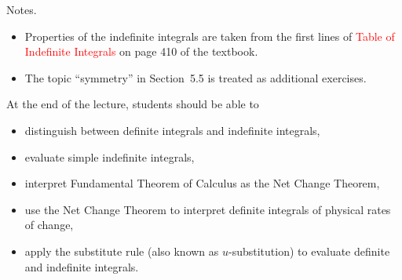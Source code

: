 \documentclass[../main]{subfiles}
\begin{document}
%
%
Notes.
  \begin{itemize}
    \item Properties of the indefinite integrals are taken from the first lines of \textcolor{red}{ Table of Indefinite Integrals} on page 410 of the textbook.
    \item The topic ``symmetry'' in Section~5.5 is treated as additional exercises.
  \end{itemize}
  




%
%

  At the end of the lecture, students should be able to
  \begin{itemize}
    \item distinguish between definite integrals and indefinite integrals, 
    \item evaluate simple indefinite integrals, 
    \item interpret Fundamental Theorem of Calculus as the Net Change Theorem,
    \item use the Net Change Theorem to interpret definite integrals of physical rates of change,
    \item apply the substitute rule (also known as \(u\)-substitution) to evaluate definite and indefinite integrals.
  \end{itemize}




%
%
%
\end{document}
